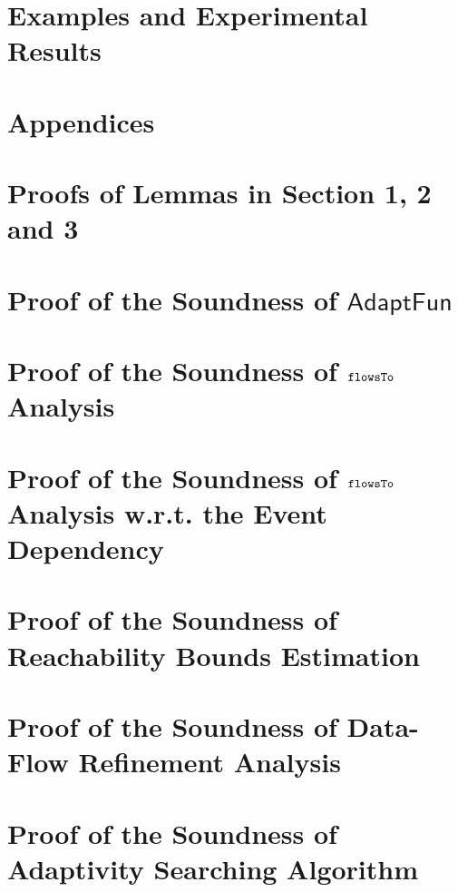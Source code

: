 \documentclass[a4paper,11pt]{article}
\newcommand{\THESYSTEM}{\textsf{AdaptFun}}
\begin{document}
\section{Examples and Experimental Results}


%
\clearpage
\appendix
{}
\section*{Appendices}
\section{Proofs of Lemmas in Section 1, 2 and 3 }
\label{apdx:lemma_sec123}

\section{Proof of the Soundness of $\THESYSTEM$}
\label{apdx:adapt_soundness}

\clearpage
\section{Proof of the Soundness of $\mathtt{flowsTo}$ Analysis}
\label{apdx:flowsto_soundness}

\clearpage
\section{Proof of the Soundness of $\mathtt{flowsTo}$ Analysis w.r.t. the Event Dependency}
\label{apdx:flowsto_event_soundness}

\clearpage
% 
% 
\clearpage
\section{Proof of the Soundness of Reachability Bounds Estimation}
\label{apdx:reachability_soundness}

\clearpage
\section{Proof of the Soundness of Data-Flow Refinement Analysis}
\label{apdx:rd_soundness}

\clearpage
\section{Proof of the Soundness of Adaptivity Searching Algorithm}
\label{apdx:adaptalg_soundness}



\end{document}
